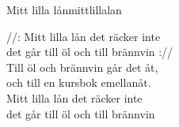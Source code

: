 \begin{song}{Mitt lilla lån}{mittlillalan}
\begin{vers}
//: Mitt lilla lån det räcker inte\\
det går till öl och till brännvin ://\\
Till öl och brännvin går det åt,\\
och till en kursbok emellanåt.\\
Mitt lilla lån det räcker inte\\
det går till öl och till brännvin\\
\end{vers}
\end{song}
